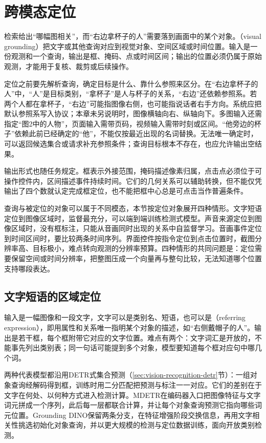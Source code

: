 \section{跨模态定位}
\label{sec:vision-understanding-grounding}
\label{sec:vision-understanding-grounding-query}

检索给出“哪幅图相关”，而“右边拿杯子的人”需要落到画面中的某个对象。（visual grounding）把文字或其他查询对应到视觉对象、空间区域或时间位置。输入是一份观测和一个查询，输出是框、掩码、点或时间区间；输出的位置必须仍属于原始观测，才能用于复核、裁剪或后续操作。

定位之前要先解析查询，确定目标是什么、靠什么参照来区分。在“右边拿杯子的人”中，“人”是目标类别，“拿杯子”是人与杯子的关系，“右边”还依赖参照系。若两个人都在拿杯子，“右边”可能指图像右侧，也可能指说话者右手方向。系统应把默认参照系写入协议；本章未另说明时，图像横轴向右、纵轴向下。多图输入还需指定“图2中的人物”，页面输入需带页码，视频输入需带时刻或区间。“他旁边的杯子”依赖此前已经确定的“他”，不能仅按最近出现的名词替换。无法唯一确定时，可以返回候选集合或请求补充参照条件；查询目标根本不存在，也应允许输出空结果。

输出形式也随任务规定。框表示外接范围，掩码描述像素归属，点击点必须位于可操作控件内，区间描述事件持续时间。它们的几何关系可以辅助转换，但不能仅凭输出了四个数就认定完成框定位，也不能把框中心总是可点击当作普遍条件。

查询与被定位的对象可以属于不同模态，本节按定位对象展开四种情形。文字短语定位到图像区域时，监督最充分，可以端到端训练检测式模型。声音来源定位到图像区域时，没有框标注，只能从音画同时出现的关系中自监督学习。音画事件定位到时间区间时，要比较两条时间序列。界面控件按指令定位到点击位置时，截图分辨率高、目标极小，难点转向观测的分辨率预算。四种情形的共同问题是：定位需要保留空间或时间分辨率，把整图压成一个向量再与整句比较，无法知道哪个位置支持哪段表达。

\subsection{文字短语的区域定位}
\label{sec:vision-understanding-grounding-match}

输入是一幅图像和一段文字，文字可以是类别名、短语，也可以是（referring expression），即用属性和关系唯一指明某个对象的描述，如“右侧戴帽子的人”。输出是若干框，每个框附带它对应的文字位置。难点有两个：文字词汇是开放的，不能事先列出类别表；同一句话可能提到多个对象，模型要知道每个框对应句中哪几个词。

两种代表模型都沿用DETR式集合预测（\ref{sec:vision-recognition-detr}节）：一组对象查询经解码得到框，训练时用二分匹配把预测与标注一一对应。它们的差别在于文字在何处、以何种方式进入检测计算。MDETR在编码器入口把图像特征与文字词元拼成一个序列，此后每一层都联合计算，并让每个对象查询预测它指向哪些词元位置。Grounding DINO保留两条分支，在特征增强阶段交换信息，再用文字相关性挑选初始化对象查询，并以更大规模的检测与定位数据训练，面向开放类别检测。

